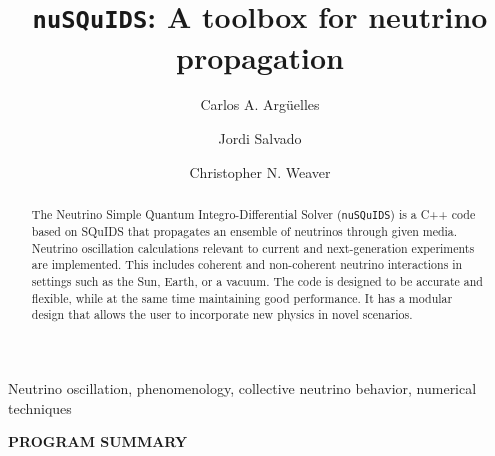 \documentclass[3p,12pt]{elsarticle}
\begin{document}
\begin{frontmatter}

\title{\texttt{nuSQuIDS}: A toolbox for neutrino propagation\ifdefined\forjournal\else{}\fi}

\author[HU]{Carlos A. Arg\"uelles}
\author[UB]{Jordi Salvado}
\author[MSU]{Christopher N. Weaver}

\address[HU]{Department of Physics \& Laboratory for Particle Physics and Cosmology, Harvard University, Cambridge, MA 02138, USA}
\address[UB]{Departament de F\'isica Qu\`antica i Astrofísica and Institut de Ciencies del Cosmos,
Universitat de Barcelona, Diagonal 647, E-08028 Barcelona, Spain}
\address[MSU]{Dept. of Physics and Astronomy, Michigan State University, East Lansing, MI 48824, USA}

\ifdefined\manualonly
\else %
\ifdefined\forjournal
{}
\else
{}
\fi %

\begin{abstract}
The Neutrino Simple Quantum Integro-Differential Solver (\texttt{nuSQuIDS})
is a C++ code based on SQuIDS that propagates an ensemble of neutrinos
through given media. Neutrino oscillation calculations relevant to
current and next-generation experiments are implemented. 
This includes coherent and non-coherent neutrino interactions in
settings such as the Sun, Earth, or a vacuum.
The code is designed to be accurate and flexible, while at the
same time maintaining good performance. It has a modular design that
allows the user to incorporate new physics in novel scenarios. 
\end{abstract}

\begin{keyword}
Neutrino oscillation, phenomenology, collective neutrino behavior, numerical techniques
\end{keyword}
\fi %

\end{frontmatter}

\ifdefined\forjournal
{\bf PROGRAM SUMMARY}
\end{document}
